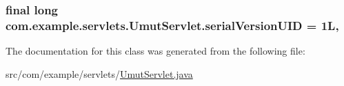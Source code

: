 \subsubsection[{serial\+Version\+U\+I\+D}]{\setlength{\rightskip}{0pt plus 5cm}final long com.\+example.\+servlets.\+Umut\+Servlet.\+serial\+Version\+U\+I\+D = 1\+L\hspace{0.3cm}{\ttfamily [static]}, {\ttfamily [private]}}\label{classcom_1_1example_1_1servlets_1_1_umut_servlet_a2ac8210ed285393de2a441e311db1ea5}


The documentation for this class was generated from the following file\+:\begin{DoxyCompactItemize}
\item 
src/com/example/servlets/\hyperlink{_umut_servlet_8java}{Umut\+Servlet.\+java}\end{DoxyCompactItemize}
